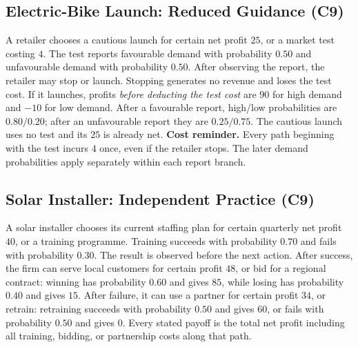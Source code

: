 \subsection{Electric-Bike Launch: Reduced Guidance (C9)}\label{sec:bike}
A retailer chooses a cautious launch for certain net profit $25$, or a market test costing $4$. The test reports favourable demand with probability $0.50$ and unfavourable demand with probability $0.50$. After observing the report, the retailer may stop or launch. Stopping generates no revenue and loses the test cost. If it launches, profits \emph{before deducting the test cost} are $90$ for high demand and $-10$ for low demand. After a favourable report, high/low probabilities are $0.80/0.20$; after an unfavourable report they are $0.25/0.75$. The cautious launch uses no test and its $25$ is already net.
\label{task:bike}
\textbf{Cost reminder.} Every path beginning with the test incurs $4$ once, even if the retailer stops. The later demand probabilities apply separately within each report branch.

\subsection{Solar Installer: Independent Practice (C9)}\label{sec:solar}
A solar installer chooses its current staffing plan for certain quarterly net profit $40$, or a training programme. Training succeeds with probability $0.70$ and fails with probability $0.30$. The result is observed before the next action. After success, the firm can serve local customers for certain profit $48$, or bid for a regional contract: winning has probability $0.60$ and gives $85$, while losing has probability $0.40$ and gives $15$. After failure, it can use a partner for certain profit $34$, or retrain: retraining succeeds with probability $0.50$ and gives $60$, or fails with probability $0.50$ and gives $0$. Every stated payoff is the total net profit including all training, bidding, or partnership costs along that path.
\label{task:solar}

